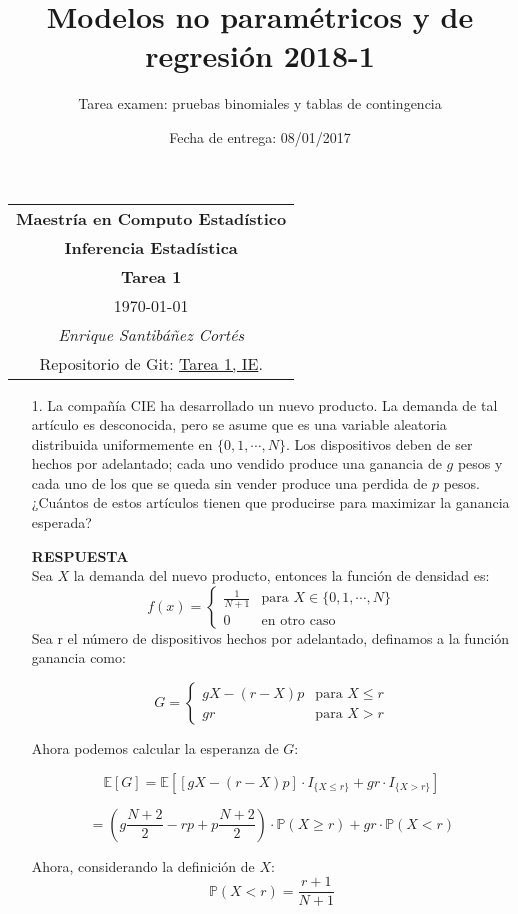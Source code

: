 \documentclass[11pt,letterpaper]{article}
\title{Modelos no paramétricos y de regresión 2018-1}
\author{Tarea examen: pruebas binomiales y tablas de contingencia}
\date{Fecha de entrega: 08/01/2017}
\newcommand{\mP}{\mathbb{P}}
\newcommand{\mE}{\mathbb{E}}
\newcommand{\res}{\textbf{RESPUESTA}\\}
\begin{document}
\begin{table}[ht]
\centering
\begin{tabular}{c}
\textbf{Maestría en Computo Estadístico}\\
\textbf{Inferencia Estadística} \\
\textbf{Tarea 1}\\
\today \\
\emph{Enrique Santibáñez Cortés}\\
Repositorio de Git: \href{https://github.com/Enriquesec/Inferencia_Estad-stica/tree/master/Tareas/Tarea_1}{Tarea 1, IE}.
\end{tabular}
\end{table}
\begin{itemize}
\item[1.] La compañía CIE ha desarrollado un nuevo producto. La demanda de tal artículo es desconocida, pero se asume que es una variable aleatoria distribuida uniformemente en $\{0, 1, \cdots, N \}$.
Los dispositivos deben de ser hechos por adelantado; cada uno vendido produce una ganancia de $g$ pesos y cada uno de los que se queda sin vender produce una perdida de $p$ pesos.
¿Cuántos de estos artículos tienen que producirse para maximizar la ganancia esperada?

\res
Sea $X$ la demanda del nuevo producto, entonces la función de densidad es: 
\begin{equation*}
f(x) = \left\{\begin{array}{ll}
\frac{1}{N+1}& \text{para } X\in\{0,1,\cdots , N\}\\
0 & \text{en otro caso} 
\end{array} \right.
\end{equation*}
Sea r el número de dispositivos hechos por adelantado, definamos a la función ganancia como:

\begin{equation*}
G = \left\{\begin{array}{ll}
gX-(r-X)p & \text{para } X\leq r\\
gr & \text{para } X>r
\end{array} \right.
\end{equation*}

Ahora podemos calcular la esperanza de $G$:

$$\mE[G]=\mE[[gX-(r-X)p]\cdot I_{\{X\leq r \}}+gr\cdot I_{\{X >r\}}] $$

$$=\left( g\frac{N+2}{2}-rp+p\frac{N+2}{2}\right)\cdot\mP(X\geq r) +gr \cdot \mP(X<r)$$

Ahora, considerando la definición de $X$:
$$\mP(X<r)=\frac{r+1}{N+1}$$


\end{itemize}
\end{document}
